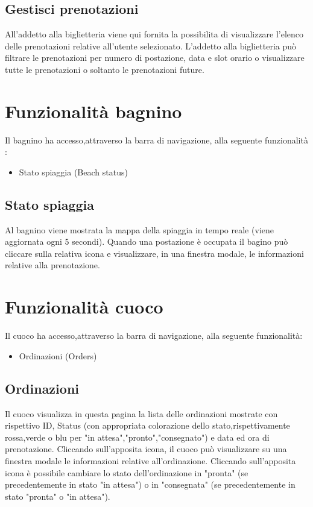 \documentclass{article}
\begin{document}
\subsection{Gestisci prenotazioni}
All'addetto alla biglietteria viene qui fornita la possibilita di visualizzare l'elenco delle prenotazioni relative all'utente selezionato. L'addetto alla biglietteria può filtrare le prenotazioni per numero di postazione, data e slot orario o visualizzare tutte le prenotazioni o soltanto le prenotazioni future.
\section{Funzionalità bagnino}
Il bagnino ha accesso,attraverso la barra di navigazione, alla seguente funzionalità :
\begin{itemize}
	\item Stato spiaggia (Beach status)
\end{itemize} 
\subsection{Stato spiaggia}
Al bagnino viene mostrata la mappa della spiaggia in tempo reale (viene aggiornata ogni 5 secondi). Quando una postazione è occupata il bagino può cliccare sulla relativa icona e visualizzare, in una finestra modale, le informazioni relative alla prenotazione.
\section{Funzionalità cuoco}
Il cuoco ha accesso,attraverso la barra di navigazione, alla seguente funzionalità:
\begin{itemize}
	\item Ordinazioni (Orders)
\end{itemize} 
\newpage
\subsection{Ordinazioni}
Il cuoco visualizza in questa pagina la lista delle ordinazioni mostrate con rispettivo ID, Status (con appropriata colorazione dello stato,rispettivamente rossa,verde o blu per "in attesa","pronto","consegnato")  e data ed ora di prenotazione.
Cliccando sull'apposita icona, il cuoco può visualizzare su una finestra modale le informazioni relative all'ordinazione. Cliccando sull'apposita icona è possibile cambiare lo stato dell'ordinazione in "pronta" (se precedentemente in stato "in attesa") o in "consegnata" (se precedentemente in stato "pronta" o "in attesa").
\end{document}

